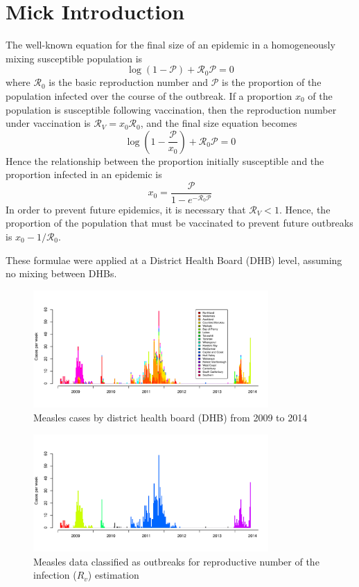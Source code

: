 \documentclass{article}
\newcommand{\Pe}{\mathcal{P}}
\newcommand{\Ro}{\mathcal{R}_0}
\newcommand{\Rr}{\mathcal{R}}
\begin{document}
\section{Mick Introduction}

The well-known equation for the final size of an epidemic in a homogeneously mixing susceptible population is \citep{diekmann13}
$$\log\left(1-\Pe\right)+\Ro\Pe=0$$
where $\Ro$ is the basic reproduction number and $\Pe$ is the proportion of the population infected over the course of the outbreak.
If a proportion $x_0$ of the population is susceptible following vaccination, then the  reproduction number under vaccination is $\Rr_V=x_0\Ro$, and the final size equation becomes
$$\log\left(1-\frac{\Pe}{x_0}\right)+\Ro\Pe=0$$
Hence the relationship between the proportion initially susceptible and the proportion infected in an epidemic is
$$x_0=\frac{\Pe}{1-e^{-\Ro\Pe}}$$
In order to prevent future epidemics, it is necessary that $\Rr_V<1$. Hence, the proportion of the population that must be vaccinated to prevent future outbreaks is $x_0-1/\Ro$.

These formulae were applied at a District Health Board (DHB) level, assuming no mixing between DHBs.


\begin{figure}
     \centering
     \includegraphics[width=0.8\textwidth]{cases_by_dhb_2009_2014.pdf}
     \caption{Measles cases by district health board (DHB) from 2009 to 2014}
     \label{fig:dhbcases}
\end{figure}

\begin{figure}
     \centering
     \includegraphics[width=0.8\textwidth]{outbreaks_for_R0.pdf}
     \caption{Measles data classified as outbreaks for reproductive number of the infection ($R_v$) estimation}
     \label{fig:outbreaks}
\end{figure}
\end{document}
